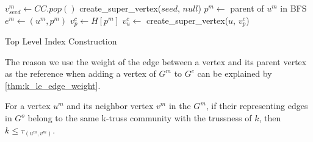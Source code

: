 \begin{algorithm}
	\BlankLine
	 {
		$v^{m}_{seed} \gets CC.pop()$\;
		create\_super\_vertex($seed$, $null$)\;
		 {
			$p^m \gets$ parent of $u^m$ in BFS\;
			$e^m \gets (u^m, p^m)$\;
			$v^{c}_{p} \gets H[p^m]$\;
			\lWhile{$\tau_{v^{c}_{p}} > \tau_{e^m}$}{
					${v^{c}_{p}}^{\prime} \gets v^{c}_{p}$, $v^{c}_{p} \gets v^{c}_{p}.parent$
			}
			 {
				 {
					$v^{c}_{u} \gets$ create\_super\_vertex($u$, $v^{c}_{p}$)\;
				}
			}
		}
	}
	\BlankLine
	\caption{Top Level Index Construction}
	\label{alg:\treeindex{}_construction}
\end{algorithm}

The reason we use the weight of the edge between a vertex and its parent vertex as the reference when adding a vertex of $G^m$ to $G^c$ can be explained by \autoref{thm:k_le_edge_weight}. 

\begin{Thm}
For a vertex $u^m$ and its neighbor vertex $v^m$ in the \inducedgraph{} $G^m$, if their representing edges in $G^o$ belong to the same k-truss community with the trussness of $k$, then $k \le \tau_{(u^m,v^m)}$. 
\label{thm:k_le_edge_weight}
\end{Thm}

